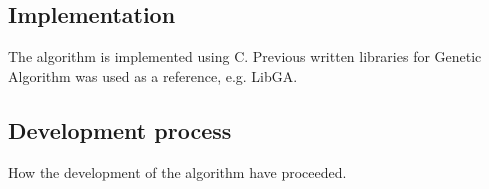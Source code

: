 \subsection{Implementation}
The algorithm is implemented using C. Previous written libraries for Genetic Algorithm was used as a reference, e.g. LibGA.

\subsection{Development process}
How the development of the algorithm have proceeded.\\
